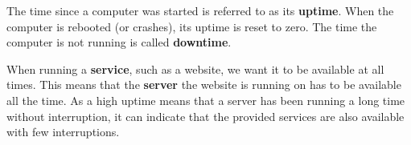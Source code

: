 
The time since a computer was started is referred to as its
\textbf{uptime}. When the computer is rebooted (or crashes), its uptime is
reset to zero. The time the computer is not running is called
\textbf{downtime}.

When running a \textbf{service}, such as a website, we want it to be
available at all times. This means that the \textbf{server} the website is
running on has to be available all the time. As a high uptime means
that a server has been running a long time without interruption, it
can indicate that the provided services are also available with few
interruptions.


